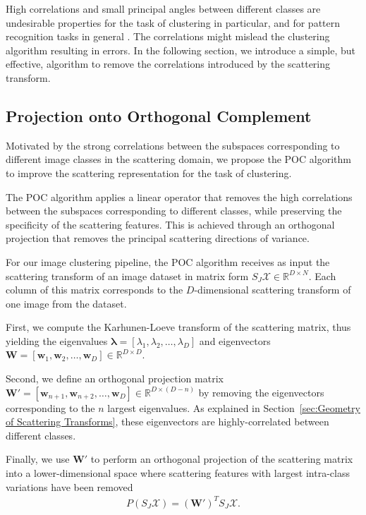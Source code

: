 \documentclass[11pt]{article}
\theoremstyle{definition}
\newcommand{\ScatteringFeatures}{S_J\mathcal{X}}
\newcommand{\Eigenvalues}{\boldsymbol{\lambda}}
\newcommand{\Eigenvalue}[1]{\lambda_{#1}}
\newcommand{\Eigenvectors}{\mathbf{W}}
\newcommand{\Eigenvector}[1]{\mathbf{w}_{#1}}
\newcommand{\Section}[1]{Section~\ref{#1}}
\begin{document}
High correlations and small principal angles between different classes are undesirable properties for the task of clustering in particular, and for pattern recognition tasks in general \cite{Huang_RoleOfPrincipalAngelsSubspaceClassification_2015}. The correlations might mislead the clustering algorithm resulting in errors. In the following section, we introduce a simple, but effective, algorithm to remove the correlations introduced by the scattering transform. 



\subsection{Projection onto Orthogonal Complement}\label{sec:Projection onto Orthogonal Complement}

Motivated by the strong correlations between the subspaces corresponding to different image classes in the scattering domain, we propose the POC algorithm to improve the scattering representation for the task of clustering.

The POC algorithm applies a linear operator that removes the high correlations between the subspaces corresponding to  different classes, while preserving the specificity of the scattering features. This is achieved through an orthogonal projection that removes the principal scattering directions of variance.

For our image clustering pipeline, the POC algorithm receives as input the scattering transform of an image dataset in matrix form $\ScatteringFeatures \in \mathbb{R}^{D \times N}$. Each column of this matrix corresponds to the $D$-dimensional scattering transform of one image from the dataset.

First, we compute the Karhunen-Loeve transform of the scattering matrix, thus yielding the eigenvalues $\Eigenvalues = [\Eigenvalue{1}, \Eigenvalue{2}, \ldots, \Eigenvalue{D}]$ and eigenvectors $\Eigenvectors = [\Eigenvector{1}, \Eigenvector{2}, \ldots, \Eigenvector{D}] \in \mathbb{R}^{D \times D}$. 

Second, we define an orthogonal projection matrix $\Eigenvectors' = [\Eigenvector{n+1}, \Eigenvector{n+2}, \ldots, \Eigenvector{D}] \in \mathbb{R}^{D \times (D-n)}$  by removing the eigenvectors corresponding to the $n$ largest eigenvalues. As explained in \Section{sec:Geometry of Scattering Transforms}, these eigenvectors are highly-correlated between different classes. 

Finally, we use $\Eigenvectors'$ to perform an orthogonal projection of the scattering matrix into a lower-dimensional space where scattering features with largest intra-class variations have been removed
\begin{align}
P(\ScatteringFeatures) = (\Eigenvectors')^T  \ScatteringFeatures.
\end{align}
\end{document}
